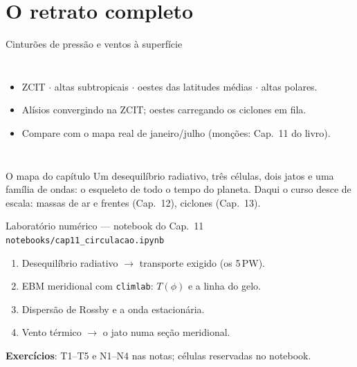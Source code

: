 \documentclass[aspectratio=169,11pt]{beamer}
\begin{document}
\section{O retrato completo}

\begin{frame}{Cinturões de pressão e ventos à superfície}
  \begin{columns}
    \begin{itemize}
      \item ZCIT $\cdot$ altas subtropicais $\cdot$ oestes das
            latitudes médias $\cdot$ altas polares.
      \item Alísios convergindo na ZCIT; oestes carregando os
            ciclones em fila.
      \item Compare com o mapa real de janeiro/julho (monções:
            Cap.~11 do livro).
    \end{itemize}
  \end{columns}
\end{frame}

\begin{frame}{O mapa do capítulo}
  \vspace{0.6em}
  Um desequilíbrio radiativo, três células, dois jatos e uma família de
  ondas: o esqueleto de todo o tempo do planeta. Daqui o curso desce de
  escala: massas de ar e frentes (Cap.~12), ciclones (Cap.~13).
\end{frame}

\begin{frame}{Laboratório numérico --- notebook do Cap.~11}
  \texttt{notebooks/cap11\_circulacao.ipynb}
  \begin{enumerate}
    \item Desequilíbrio radiativo $\to$ transporte exigido (os 5\,PW).
    \item EBM meridional com \texttt{climlab}: $T(\phi)$ e a linha do
          gelo.
    \item Dispersão de Rossby e a onda estacionária.
    \item Vento térmico $\to$ o jato numa seção meridional.
  \end{enumerate}
  \vspace{0.4em}
  \textbf{Exercícios}: T1--T5 e N1--N4 nas notas; células reservadas no
  notebook.
  \vfill
  \atribuicao
\end{frame}
\end{document}
